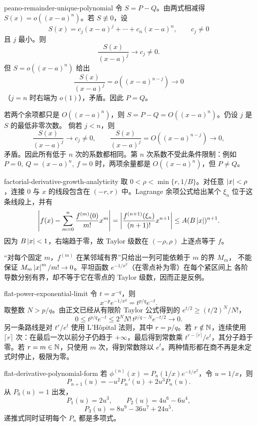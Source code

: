 \begin{solution}{peano-remainder-unique-polynomial}
令 \(S=P-Q\)。由两式相减得 \(S(x)=o((x-a)^n)\)。若 \(S\not\equiv0\)，设
\[
 S(x)=c_j(x-a)^j+\cdots+c_n(x-a)^n,\qquad c_j\ne0
\]
且 \(j\) 最小。则
\[
 \frac{S(x)}{(x-a)^j}\longrightarrow c_j\ne0.
\]
但 \(S=o((x-a)^n)\) 给出
\[
 \frac{S(x)}{(x-a)^j}
 =o((x-a)^{n-j})\longrightarrow0
\]
（\(j=n\) 时右端为 \(o(1)\)），矛盾。因此 \(P=Q\)。

若两个余项都只是 \(O((x-a)^n)\)，则 \(S=P-Q=O((x-a)^n)\)。仍设 \(j\) 是 \(S\) 的最低非零次数。
倘若 \(j<n\)，则
\[
 \frac{S(x)}{(x-a)^j}\longrightarrow c_j\ne0,
 \qquad
 \frac{S(x)}{(x-a)^j}=O((x-a)^{n-j})\longrightarrow0,
\]
矛盾。因此所有低于 \(n\) 次的系数都相同。第 \(n\) 次系数不受此条件限制：例如
\(P=0,\ Q=(x-a)^n,\ f=0\) 时，两项余量都是 \(O((x-a)^n)\)，但 \(P\ne Q\)。
\end{solution}

\begin{solution}{factorial-derivative-growth-analyticity}
取 \(0<\rho<\min\{r,1/B\}\)。对任意 \(\left|x\right|<\rho\)，连接 \(0\) 与 \(x\) 的线段包含在
\((-r,r)\) 中。Lagrange 余项公式给出某个 \(\xi_n\) 位于这条线段上，并有
\[
 \left|f(x)-\sum_{m=0}^n\frac{f^{(m)}(0)}{m!}x^m\right|
 =\left|\frac{f^{(n+1)}(\xi_n)}{(n+1)!}x^{n+1}\right|
 \le A(B\left|x\right|)^{n+1}.
\]
因为 \(B\left|x\right|<1\)，右端趋于零，故 Taylor 级数在 \((-\rho,\rho)\) 上逐点等于 \(f\)。

“对每个固定 \(m\)，\(f^{(m)}\) 在某邻域有界”只给出一列可能依赖于 \(m\) 的界 \(M_m\)，
不能保证 \(M_m\left|x\right|^m/m!\to0\)。平坦函数 \(e^{-1/x^2}\)（在零点补为零）在每个紧区间上
各阶导数分别有界，却不等于它在零点的 Taylor 级数，因而正是反例。
\end{solution}

\begin{solution}{flat-power-exponential-limit}
令 \(t=x^{-q}\)，则
\[
 x^{-p}e^{-1/x^q}=t^{p/q}e^{-t}.
\]
取整数 \(N>p/q\)。由正文已经从有限阶 Taylor 公式得到的
\(e^{t/2}\ge(t/2)^N/N!\)，
\[
 0\le t^{p/q}e^{-t}
 \le 2^NN!\,t^{p/q-N}e^{-t/2}\longrightarrow0.
\]
另一条路线是对 \(t^{r}/e^t\) 使用 L'Hôpital 法则，其中 \(r=p/q\)。若 \(r\notin\mathbb{N}\)，连续使用 \(\lceil r\rceil\) 次：在最后一次以前分子仍趋于 \(+\infty\)，最后得到常数乘 \(t^{r-\lceil r\rceil}/e^t\)，其分子趋于零。若 \(r=m\in\mathbb{N}\)，只使用 \(m\) 次，得到常数除以 \(e^t\)。两种情形都在商不再是未定式时停止，极限为零。
\end{solution}

\begin{solution}{flat-derivative-polynomial-form}
若
\(\phi^{(n)}(x)=P_n(1/x)e^{-1/x^2}\)，令 \(u=1/x\)，则
\[
 P_{n+1}(u)=-u^2P_n'(u)+2u^3P_n(u).
\]
从 \(P_0(u)=1\) 出发，
\[
 P_1(u)=2u^3,\qquad
 P_2(u)=4u^6-6u^4,
\]
\[
 P_3(u)=8u^9-36u^7+24u^5.
\]
递推式同时证明每个 \(P_n\) 都是多项式。
\end{solution}

